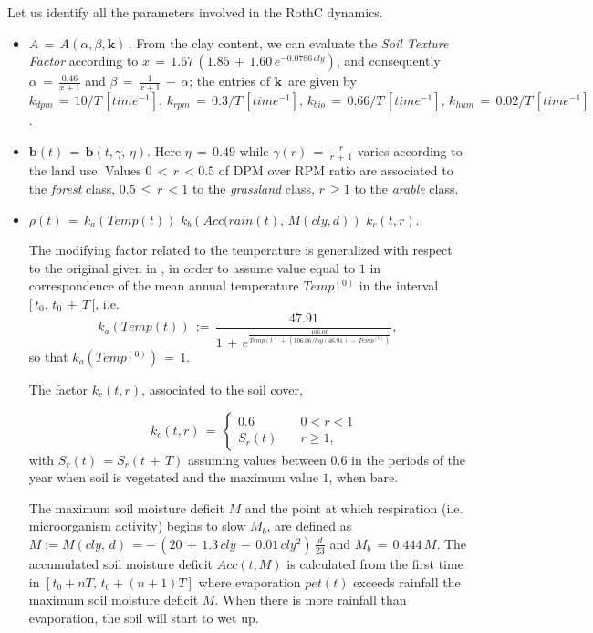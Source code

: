 \noindent Let us identify all the parameters involved in the RothC dynamics. 
\begin{itemize}
    \item $A\,=\,A(\alpha,\beta, \mathbf{k})\, $.
From the  clay content, we can evaluate the {\it Soil Texture Factor} according to $x\,=\, 1.67\,(1.85\,+\,1.60\,e^{-0.0786\, cly})$, and consequently  $\alpha\, = \,\displaystyle \frac{0.46}{x+1}$ and $\beta\, =\, \displaystyle \frac{1}{x+1}\,-\, \alpha$;
the entries of $\mathbf{k}$\, are  given by  $k_{dpm}\,=\,10/T \,[time^{-1}],\,k_{rpm}\,=\,0.3/T\, [time^{-1}],\,k_{bio}\,=\,0.66/T\, [time^{-1}],\,k_{hum}\,=\,0.02/T\,[time^{-1}]$ .
    \item $\mathbf{b}(t)\, =\, \mathbf{b}(t,\gamma,\, \eta).$ Here $\eta\, =\, 0.49$ while $\gamma(r)\,=\, \displaystyle \frac{r}{r\,+\,1}$  varies according to the land use. Values  $0\,<\,r\,< 0.5$ of  DPM over RPM ratio are associated to the {\it forest} class, $0.5\,\leq\,r\,<1 $ to the  {\it grassland} class, $r\,\geq 1 $ to the {\it arable} class. 
    
 
    \item $\rho(t)\,=\, k_a(Temp(t))\,\, k_b\left(Acc(rain(t),\,M(cly,d)\right)\,\, k_c(t,r)$. 
    
    
    \noindent The modifying factor related to the temperature is generalized with respect to the original given in \cite{coleman1996rothc}, in order to assume value equal to $1$ in correspondence of the mean annual temperature  $Temp^{(0)}$  in the interval $[\,t_0,\, t_0\,+\,T\,[ $, i.e.
$$
     k_a(Temp(t))\, :=\, \displaystyle \frac{47.91}{1\,+\, e^{\displaystyle \frac{106.06}{Temp(t)\,+\,(106.06/log(46.91)\,-\,Temp^{(0)})}}},
     $$
     so that  $k_a(Temp^{(0)})\, =\, 1$.
     
     \noindent The factor $k_c(t,r)$,  associated to  the soil cover, 
   
    $$
     \quad k_c(t,r)\,=\, \left\{ \begin{array}{cl}
          0.6& \quad 0 < r <1 \\
          S_r(t)& \quad r \geq 1 ,
     \end{array}
      \right.$$
   with $S_r(t)\, =S_r(t\,+\,T)$ assuming  values between $0.6$ in the periods of the year when soil is vegetated and the maximum value $1$, when bare. 
   
   
     \noindent The maximum soil moisture deficit $M$ and the point at which respiration (i.e. microorganism activity) begins
     to slow $M_b$, are defined as 
     $M:=M(cly,\, d)\,= -\, ( 20 \,+\, 1.3\,  cly\,-\, 0.01\, cly^2)\, \displaystyle \frac{d}{23}$ and  $ M_b\, =\, 0.444\, M$. The  accumulated soil moisture deficit  
     $Acc(t,M)$ is calculated 
from the first time in $[t_0+nT, \, t_0+(n+1)T]$ where evaporation $pet(t)$ exceeds rainfall %
the maximum soil moisture deficit $M$. When there is more rainfall
than evaporation, the soil will start to wet up.


\end{itemize}
